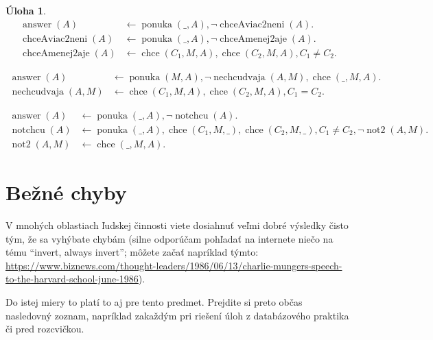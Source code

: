 \documentclass[10pt, a4paper]{article}
\theoremstyle{definition}
\newtheorem{problem}{Úloha}[section]
\def\endwrong{\color{black}}
\DeclareMathOperator{\ponuka}{ponuka}
\DeclareMathOperator{\chce}{chce}
\DeclareMathOperator{\answer}{answer}
\begin{document}
\begin{problem}
\begin{align*}
\answer(A) & \leftarrow \ponuka(\_,A), \neg \operatorname{chceAviac2neni}(A).\\
\operatorname{chceAviac2neni}(A) & \leftarrow \ponuka(\_,A), \neg \operatorname{chceAmenej2aje}(A).\\
\operatorname{chceAmenej2aje}(A) & \leftarrow \chce(C_1,M,A), \chce(C_2,M,A), C_1 \neq C_2.
\end{align*}

\begin{align*}
\answer(A) & \leftarrow \ponuka(M,A), \neg \operatorname{nechcudvaja}(A, M), \chce(\_, M, A).\\
\operatorname{nechcudvaja}(A, M) & \leftarrow \chce(C_1, M, A), \chce(C_2, M, A), C_1=C_2.
\end{align*}

\begin{align*}
\answer(A)& \leftarrow \ponuka(\_, A), \neg \operatorname{notchcu}(A).\\
\operatorname{notchcu}(A)& \leftarrow \ponuka(\_, A), \chce(C_1, M, \_), \chce(C_2, M, \_), C_1 \neq C_2, \neg \operatorname{not2}(A, M).\\
\operatorname{not2}(A, M)& \leftarrow \chce(\_, M, A).
\end{align*}
\endwrong

\end{problem}

\section{Bežné chyby}

V mnohých oblastiach ľudskej činnosti viete dosiahnuť veľmi dobré výsledky čisto tým, že sa vyhýbate chybám (silne odporúčam pohľadať na internete niečo na tému \enquote{invert, always invert}; môžete začať napríklad týmto:
{\small \url{https://www.biznews.com/thought-leaders/1986/06/13/charlie-mungers-speech-to-the-harvard-school-june-1986}}). 

Do istej miery to platí to aj pre tento predmet. Prejdite si preto občas nasledovný zoznam, napríklad zakaždým pri riešení úloh z databázového praktika či pred rozcvičkou.
\end{document}
